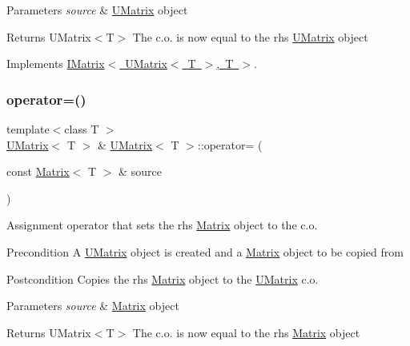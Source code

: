 \begin{DoxyParams}{Parameters}
{\em source} & \mbox{\hyperlink{class_u_matrix}{U\+Matrix}} object \\
\hline
\end{DoxyParams}
\begin{DoxyReturn}{Returns}
U\+Matrix$<$\+T$>$ The c.\+o. is now equal to the rhs \mbox{\hyperlink{class_u_matrix}{U\+Matrix}} object 
\end{DoxyReturn}


Implements \mbox{\hyperlink{class_i_matrix_a9eeb68de7e1d37d1aab439c78fea9be3}{I\+Matrix$<$ U\+Matrix$<$ T $>$, T $>$}}.

\mbox{\label{class_u_matrix_a98d77665ae6c6dd8c264d7aca57d76fd}} 
\subsubsection{\texorpdfstring{operator=()}{operator=()}\hspace{0.1cm}{\footnotesize\ttfamily [2/2]}}
{\footnotesize\ttfamily template$<$class T $>$ \\
\mbox{\hyperlink{class_u_matrix}{U\+Matrix}}$<$ T $>$ \& \mbox{\hyperlink{class_u_matrix}{U\+Matrix}}$<$ T $>$\+::operator= (\begin{DoxyParamCaption}\item[{const \mbox{\hyperlink{class_matrix}{Matrix}}$<$ T $>$ \&}]{source }\end{DoxyParamCaption})}



Assignment operator that sets the rhs \mbox{\hyperlink{class_matrix}{Matrix}} object to the c.\+o. 

\begin{DoxyPrecond}{Precondition}
A \mbox{\hyperlink{class_u_matrix}{U\+Matrix}} object is created and a \mbox{\hyperlink{class_matrix}{Matrix}} object to be copied from 
\end{DoxyPrecond}
\begin{DoxyPostcond}{Postcondition}
Copies the rhs \mbox{\hyperlink{class_matrix}{Matrix}} object to the \mbox{\hyperlink{class_u_matrix}{U\+Matrix}} c.\+o. 
\end{DoxyPostcond}

\begin{DoxyParams}{Parameters}
{\em source} & \mbox{\hyperlink{class_matrix}{Matrix}} object \\
\hline
\end{DoxyParams}
\begin{DoxyReturn}{Returns}
U\+Matrix$<$\+T$>$ The c.\+o. is now equal to the rhs \mbox{\hyperlink{class_matrix}{Matrix}} object 
\end{DoxyReturn}
\mbox{\label{class_u_matrix_a0dea1e82fbf5ae67bec479c070b185dc}} 
